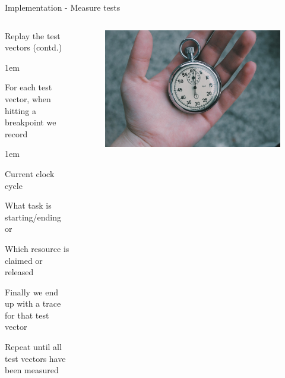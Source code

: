 \begin{frame}{Implementation - Measure tests}
    \begin{columns}
        \begin{block}{Replay the test vectors (contd.)}
            \begin{itemize-size}{1em}
                \item For each test vector, when hitting a breakpoint we record
                \begin{itemize-size}{1em}
                    \item Current clock cycle
                    \item What task is starting/ending or
                    \item Which resource is claimed or released
                \end{itemize-size}
                \item Finally we end up with a trace for that test vector
                \item Repeat until all test vectors have been measured 
            \end{itemize-size}  
        \end{block}

        \begin{figure}
           \centering
            \includegraphics[scale=0.15]{pictures/stopwatch.jpg}
        \end{figure}
    \end{columns}
\end{frame}


